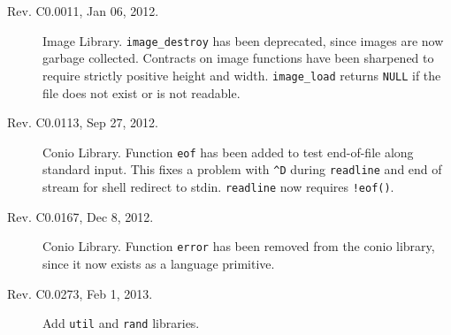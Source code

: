 \documentclass[11pt]{article}
\begin{document}
\begin{description}
\item[Rev. C0.0011, Jan 06, 2012.]  Image Library.
  \verb'image_destroy' has been deprecated, since images are now
  garbage collected.  Contracts on image functions have been sharpened
  to require strictly positive height and width.  \verb'image_load'
  returns \verb'NULL' if the file does not exist or is not readable.
\item[Rev. C0.0113, Sep 27, 2012.]  Conio Library.
  Function \verb'eof' has been added to test end-of-file along
  standard input.  This fixes a problem with \verb'^D' during
  \verb'readline' and end of stream for shell redirect to stdin.
  \verb'readline' now requires \verb'!eof()'.
\item[Rev. C0.0167, Dec 8, 2012.]  Conio Library.
  Function \verb'error' has been removed from the conio library, since
  it now exists as a language primitive.
\item[Rev. C0.0273, Feb 1, 2013.]  Add \verb'util' and \verb'rand' libraries.
\end{description}
\end{document}
